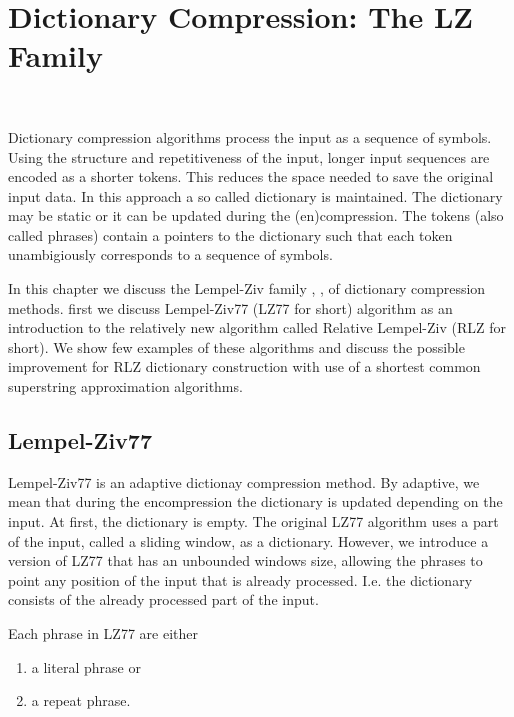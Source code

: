 \documentclass[english,twoside,censored,csm,algorithms-track-2020]{HYthesisML}
\theoremstyle{plain}
\theoremstyle{definition}
\begin{document}

\chapter{Dictionary Compression: The LZ Family}~\label{chp-rlz}

Dictionary compression algorithms \citep{Storer82} process the input as a sequence of symbols.
Using the structure and repetitiveness of the input, longer input sequences are encoded as a shorter
tokens. This reduces the space needed to save the original input data. In this approach a so called
dictionary is maintained. The dictionary may be static or it can be updated during the (en)compression.
The tokens (also called phrases) contain a pointers to the dictionary such that each token
unambigiously corresponds to a sequence of symbols. \citep{Pu05} 

In this chapter we discuss the Lempel-Ziv family \citep{Ziv77}, \citep{Ziv78}, \citep{Welch84}
 of dictionary compression methods.
first we discuss Lempel-Ziv77 (LZ77 for short) algorithm
\citep{Ziv77} as an introduction to the relatively new  algorithm called
Relative Lempel-Ziv \citep{Kurppu10} (RLZ for short). We show few examples of these algorithms and
discuss the possible improvement for RLZ dictionary construction with use of a shortest common
superstring approximation algorithms.

\section{Lempel-Ziv77}

Lempel-Ziv77 is an adaptive dictionay compression method. By adaptive, we mean that during the
encompression the dictionary is updated depending on the input. At first, the dictionary is empty. 
The original LZ77 algorithm uses a part of the input, called a sliding window, as a dictionary.
However, we introduce a version of LZ77 that has an unbounded windows size, allowing the phrases
to point any position of the input that is already processed. I.e. the dictionary consists of the
already processed part of the input.

Each phrase in LZ77 are either 
\begin{enumerate}
\item a literal phrase or
\item a repeat phrase.
\end{enumerate}
\end{document}
